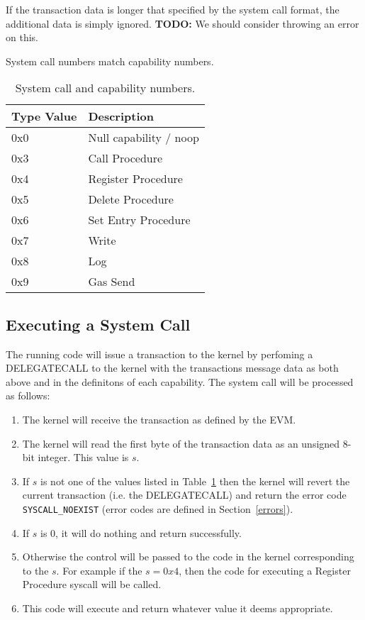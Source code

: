 \documentclass[english,a4paper]{article}
\begin{document}
If the transaction data is longer that specified by the system call format, the
additional data is simply ignored. \textbf{TODO:} We should consider throwing an
error on this.

System call numbers match capability numbers.

\begin{table}[H]
  \caption{System call and capability numbers.\label{syscall-numbers}}
  \centering{}%
  \begin{tabular}{l|p{}}
    \hline
    Type Value & Description\tabularnewline
    \hline
    \hline
    0x0 & Null capability / noop \tabularnewline
    0x3 & Call Procedure \tabularnewline
    0x4 & Register Procedure \tabularnewline
    0x5 & Delete Procedure \tabularnewline
    0x6 & Set Entry Procedure \tabularnewline
    0x7 & Write \tabularnewline
    0x8 & Log \tabularnewline
    0x9 & Gas Send \tabularnewline
    \hline
  \end{tabular}
\end{table}

\subsection{Executing a System Call}
The running code will issue a transaction to the kernel by perfoming a
DELEGATECALL to the kernel with the transactions message data as both above and
in the definitons of each capability. The system call will be processed as
follows:

\begin{enumerate}
  \item The kernel will receive the transaction as defined by the EVM.
  \item The kernel will read the first byte of the transaction data as an
  unsigned 8-bit integer. This value is $s$.
  \item If $s$ is not one of the values listed in Table~\ref{syscall-numbers}
  then the kernel will revert the current transaction (i.e. the DELEGATECALL)
  and return the error code \texttt{SYSCALL\_NOEXIST} (error codes are defined
  in Section~\ref{errors}).
  \item If $s$ is 0, it will do nothing and return successfully.
  \item Otherwise the control will be passed to the code in the kernel
  corresponding to the $s$. For example if the $s = 0x4$, then the code for
  executing a Register Procedure syscall will be called.
  \item This code will execute and return whatever value it deems appropriate.
\end{enumerate}
\end{document}
